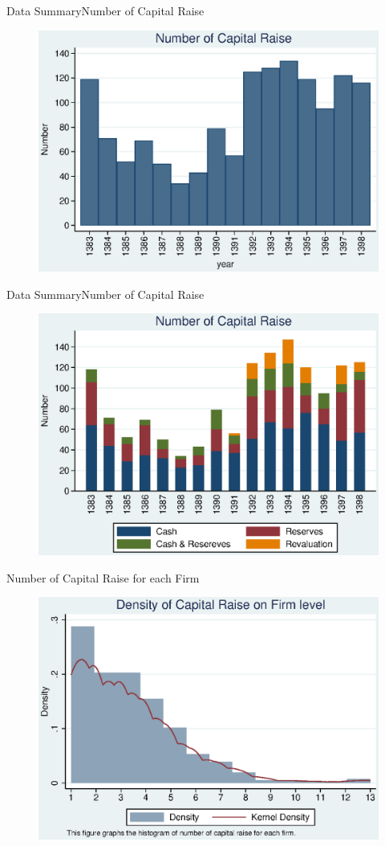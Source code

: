 \documentclass{beamer}
\begin{document}
\begin{frame}{Data Summary}{Number of Capital Raise}
\begin{figure}
\centering
\includegraphics[width=0.7\linewidth]{Number.eps}
\label{fig:number}
\end{figure}
\end{frame}

\begin{frame}{Data Summary}{Number of Capital Raise}
\begin{figure}
\centering
\includegraphics[width=0.7\linewidth]{Number2.eps}
\label{fig:number2}
\end{figure}

\end{frame}

\begin{frame}{Number of Capital Raise for each Firm}
\begin{figure}
\centering
\includegraphics[width=0.7\linewidth]{Hist.eps}
\label{fig:Hist}
\end{figure}
\end{frame}
\end{document}
